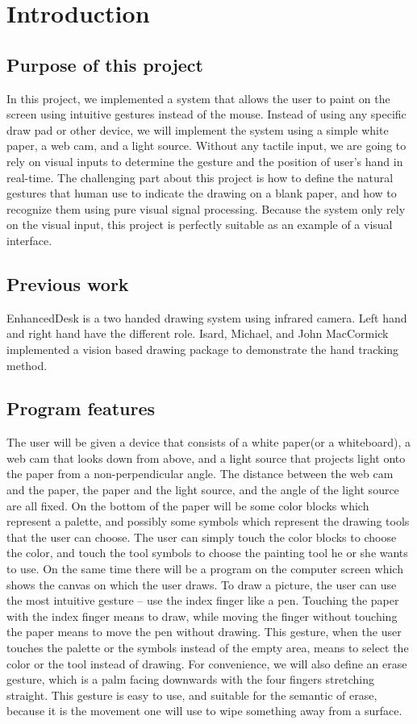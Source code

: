 \section{Introduction}
\subsection{Purpose of this project}
    In this project, we implemented a system that allows the user to paint on the screen using intuitive gestures instead of the mouse. 
    Instead of using any specific draw pad or other device, we will implement the system using a simple white paper, a web cam, and a light source. 
    Without any tactile input, we are going to rely on visual inputs to determine the gesture and the position of user's hand in real-time. 
    The challenging part about this project is how to define the natural gestures that human use to indicate the drawing on a  blank paper, and how to recognize them using pure visual signal processing. Because the system only rely on the visual input, this project is perfectly suitable as an example of a visual interface. 
\subsection{Previous work}
    EnhancedDesk\cite{a} is a two handed drawing system using infrared camera. Left hand and right hand have the different role.  Isard, Michael, and John MacCormick implemented a vision based drawing package to demonstrate the hand tracking method\cite{b}.
\subsection{Program features}
The user will be given a device that consists of a white paper(or a whiteboard), a web cam that looks down from above, 
and a light source that projects light onto the paper from a non-perpendicular angle.
The distance between the web cam and the paper, the paper and the light source, and the angle of the light source are all fixed. On the bottom of the paper will be some color blocks which represent a palette, and possibly some symbols which represent the drawing tools that the user can choose. The user can simply touch the color blocks to choose the color, and touch the tool symbols to choose the painting tool he or she wants to use. On the same time there will be a program on the computer screen which shows the canvas on which the user draws. 
To draw a picture, the user can use the most intuitive gesture -- use the index finger like a pen. 
Touching the paper with the index finger means to draw, while moving the finger without touching the paper means to move the pen without drawing. 
This gesture, when the user touches the palette or the symbols instead of the empty area, means to select the color or the tool instead of drawing. 
For convenience, we will also define an erase gesture, which is a palm facing downwards with the four fingers stretching straight. This gesture is easy to use, and suitable for the semantic of erase, because it is the movement one will use to wipe something away from a surface.
